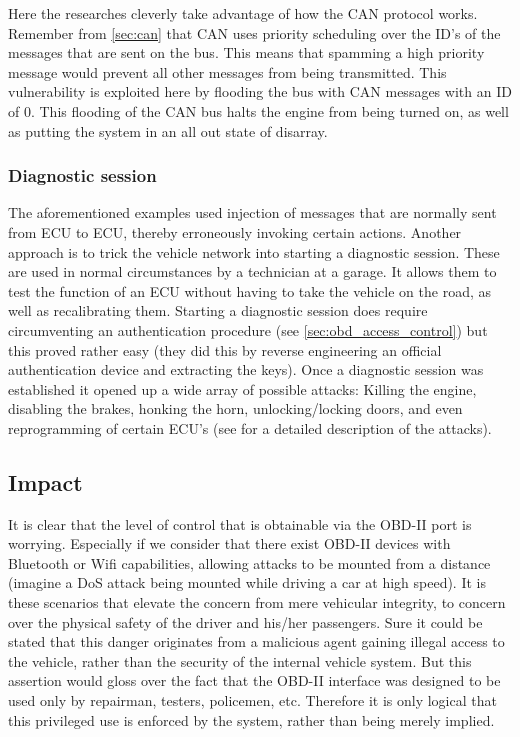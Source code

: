 Here the researches cleverly take advantage of how the CAN protocol works. Remember from \ref{sec:can} that CAN uses priority scheduling over the ID's of the messages that are sent on the bus. This means that spamming a high priority message would prevent all other messages from being transmitted. This vulnerability is exploited here by flooding the bus with CAN messages with an ID of 0. This flooding of the CAN bus halts the engine from being turned on, as well as putting the system in an all out state of disarray.

\subsubsection{Diagnostic session} 
\label{subsubsec:diagnostic_session}

The aforementioned examples used injection of messages that are normally sent from ECU to ECU, thereby erroneously invoking certain actions. Another approach is to trick the vehicle network into starting a diagnostic session. These are used in normal circumstances by a technician at a garage. It allows them to test the function of an ECU without having to take the vehicle on the road, as well as recalibrating them. Starting a diagnostic session does require circumventing an authentication procedure (see \ref{sec:obd_access_control}) but this proved rather easy (they did this by reverse engineering an official authentication device and extracting the keys). Once a diagnostic session was established it opened up a wide array of possible attacks: Killing the engine, disabling the brakes, honking the horn, unlocking/locking doors, and even reprogramming of certain ECU's (see \cite{MillerC} for a detailed description of the attacks).

\subsection{Impact}
\label{subsec:impact}

It is clear that the level of control that is obtainable via the OBD-II port is worrying. Especially if we consider that there exist OBD-II devices with Bluetooth or Wifi capabilities, allowing attacks to be mounted from a distance (imagine a DoS attack being mounted while driving a car at high speed). It is these scenarios that elevate the concern from mere vehicular integrity, to concern over the physical safety of the driver and his/her passengers. Sure it could be stated that this danger originates from a malicious agent gaining illegal access to the vehicle, rather than the security of the internal vehicle system. But this assertion would gloss over the fact that the OBD-II interface was designed to be used only by repairman, testers, policemen, etc. Therefore it is only logical that this privileged use is enforced by the system, rather than being merely implied.

